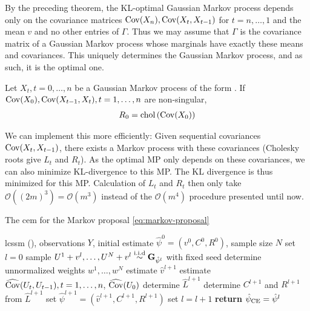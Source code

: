 \begin{tcolorbox}[title={WIP improve: order to $\mathcal O(m^{3})$}]
    By the preceding theorem, the KL-optimal Gaussian Markov process depends only on the covariance matrices $\operatorname{Cov}(X_n), \operatorname{Cov} (X_{t}, X_{t - 1})$ for $t = n, \dots, 1$ and the mean $v$ and no other entries of $\Gamma$. Thus we may assume that $\Gamma$ is the covariance matrix of a Gaussian Markov process whose marginals have exactly these means and covariances. This uniquely determines the Gaussian Markov process, and as such, it is the optimal one. 

    \begin{lemma}
        Let $X_{t}, t=0,\dots, n$ be a Gaussian Markov process of the form . If $\operatorname{Cov}(X_{0}), \operatorname{Cov}(X_{t- 1}, X_{t}), t = 1, \dots, n$ are non-singular, 
        \begin{align*}
            R_{0} = \operatorname{chol} \left( \operatorname{Cov} (X_{0}) \right)
        \end{align*}
        
    \end{lemma}

    We can implement this more efficiently: Given sequential covariances $\operatorname{Cov} (X_{t}, X_{t - 1})$, there exists a Markov process with these covariances (Cholesky roots give $L_{t}$ and $R_{t}$). As the optimal MP only depends on these covariances, we can also minimize KL-divergence to this MP. The KL divergence is thus minimized for this MP. Calculation of $L_{t}$ and $R_{t}$ then only take $\mathcal O((2m)^{3}) = \mathcal O(m^{3})$ instead of the $\mathcal O(m^{4})$ procedure presented until now. 
\end{tcolorbox}
\begin{algorithm}
    \caption{The \gls{cem} for the Markov proposal \eqref{eq:markov-proposal}}
    \label{alg:cem-markov-proposal}
    \begin{algorithmic}[1]
        \Require \gls{lcssm} (), observations $Y$, initial estimate $\hat\psi^0 = \left( v^{0}, C^{0}, R^{0}\right)$, sample size $N$
        \State set $l = 0$
        \Repeat 
            \State\label{step:cem-simulate} sample $U^{1} + v^{l}, \dots, U^{N} + v^{l} \stackrel{\text{i.i.d}}{\sim} \mathbf G_{\hat\psi^{l}}$ with fixed seed  
            \State\label{step:cem-weights} determine unnormalized weights $w^{1}, \dots, w^{N}$ 
            \State\label{step:cem-est_v} estimate $\hat v^{l + 1}$  
            \State\label{step:cem-est_cov} estimate $\widehat{\operatorname{Cov}} (U_{t}, U_{t-1}), t=1, \dots, n$, $\widehat{\operatorname{Cov}} (U_{0})$ 
            \State\label{step:cem-L} determine $\hat L^{l + 1}$ 
            \State\label{step:cem-C_R} determine $C^{l + 1}$ and $R^{l + 1}$ from $\hat L^{l + 1}$ 
            \State\label{step:cem-est_phi} set $\hat\psi^{l + 1} = \left( \hat v^{l + 1}, C^{l + 1}, R^{l + 1}\right)$ 
            \State set $l = l + 1$
        \State \textbf{return} ${\hat\psi_{\text{CE}}} = \hat \psi^{l}$
    \end{algorithmic}
\end{algorithm}

